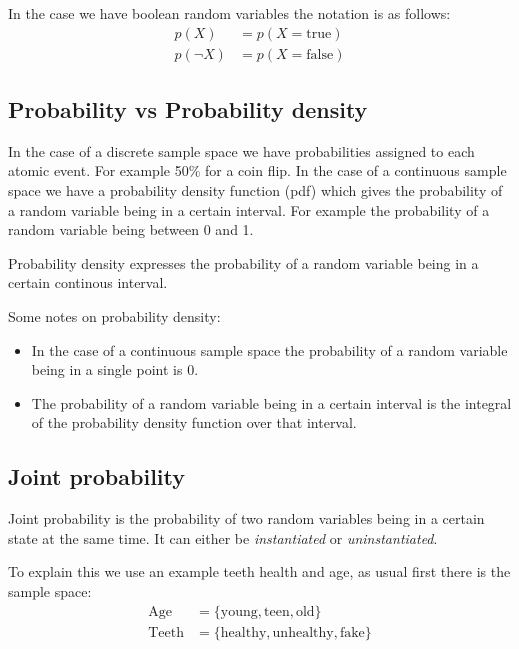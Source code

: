 \documentclass[12pt]{article}
\begin{document}
In the case we have boolean random variables the notation is as follows: 
\begin{align*}
    p(X) & = p(X = \text{true}) \\ 
    p(\neg X) & = p(X = \text{false})  
\end{align*}

\subsection{Probability vs Probability density}

In the case of a discrete sample space we have probabilities assigned to each atomic event. For example 50\% for a coin flip. In the case of a continuous sample space we have a probability density function (pdf) which gives the probability of a random variable being in a certain interval. For example the probability of a random variable being between 0 and 1.

\begin{definition}
    Probability density expresses the probability of a random variable being in a certain continous interval.
\end{definition}

Some notes on probability density:
\begin{itemize}[leftmargin=*, noitemsep]
    \item In the case of a continuous sample space the probability of a random variable being in a single point is 0.
    \item The probability of a random variable being in a certain interval is the integral of the probability density function over that interval.
\end{itemize}

\subsection{Joint probability}

\begin{definition}
    Joint probability is the probability of two random variables being in a certain state at the same time. It can either be \textit{instantiated} or \textit{uninstantiated}.
\end{definition}

To explain this we use an example teeth health and age, as usual first there is the sample space: 
\begin{align*}
    \text{Age} & = \{\text{young}, \text{teen}, \text{old}\}  \\
    \text{Teeth} & = \{\text{healthy}, \text{unhealthy}, \text{fake}\}
\end{align*}
\end{document}
